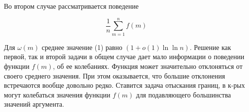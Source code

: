 \documentclass[10pt]{article}
\begin{document}
Во втором случае рассматривается поведение



\[

\frac{1}{n} \sum_{m=1}^{n} f(m)

\]



Для $\omega(m)$ среднее значение (1) равно $(1+o(1) \ln \ln n)$. Решение как первой, так и второй задачи в общем случае дает мало информации о поведении функции $f(m)$, об ее колебаниях. Функция может значительно отклоняться от своего среднего значения. При этом оказывается, что большие отклонения встречаются вообще довольно редко. Ставится задача отыскания границ, в к-рых могут колебаться значения функции $f(m)$ для подавляющего большинства значений аргумента.
\end{document}
